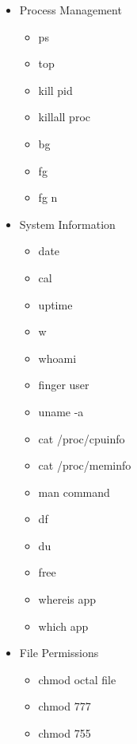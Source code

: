\documentclass{article}
\begin{document}
\begin{itemize}
\begin{itemize}
				\item ls -al \\
					display all files including hidden file + details 
				\item cd dir
				\item cd
				\item pwd
				\item mkdir dir
				\item rm file 
				\item rm -r dir
				\item rm -f file
				\item rm -rf dir
				\item cp file1 file2
				\item cp -r dir1 dir2
				\item mv file1 file2
				\item ln -s file link
				\item touch file
				\item cat > file
				\item more file
				\item head file
				\item tail file
				\item tail -f file 
			\end{itemize}
		\item Process Management
			\begin{itemize}
				\item ps 
				\item top
				\item kill pid
				\item killall proc
				\item bg
				\item fg
				\item fg n
			\end{itemize}
		\item System Information
			\begin{itemize}
				\item date
				\item cal
				\item uptime
				\item w
				\item whoami
				\item finger user
				\item uname -a
				\item cat /proc/cpuinfo
				\item cat /proc/meminfo
				\item man command
				\item df
				\item du
				\item free
				\item whereis app
				\item which app
			\end{itemize}
		\item File Permissions
			\begin{itemize}
				\item chmod octal file
				\item chmod 777
				\item chmod 755
			\end{itemize}
	\end{itemize}
\end{document}
